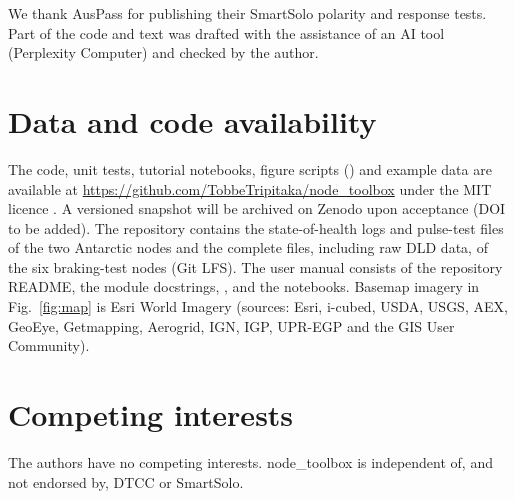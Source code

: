 \documentclass[report]{seismica}
\begin{document}
\begin{acknowledgements}
We thank AusPass for publishing their SmartSolo polarity and response tests. Part of the code and text was drafted with the assistance of an AI tool (Perplexity Computer) and checked by the author. %
\end{acknowledgements}

\section*{Data and code availability}
The code, unit tests, tutorial notebooks, figure scripts () and example data are available at \url{https://github.com/TobbeTripitaka/node_toolbox} under the MIT licence \citep{node_toolbox}. A versioned snapshot will be archived on Zenodo upon acceptance (DOI to be added). The repository contains the state-of-health logs and pulse-test files of the two Antarctic nodes and the complete files, including raw DLD data, of the six braking-test nodes (Git LFS). The user manual consists of the repository README, the module docstrings, ,  and the notebooks. Basemap imagery in Fig.~\ref{fig:map} is Esri World Imagery (sources: Esri, i-cubed, USDA, USGS, AEX, GeoEye, Getmapping, Aerogrid, IGN, IGP, UPR-EGP and the GIS User Community).

\section*{Competing interests}
The authors have no competing interests. node\_toolbox is independent of, and not endorsed by, DTCC or SmartSolo.


\end{document}
